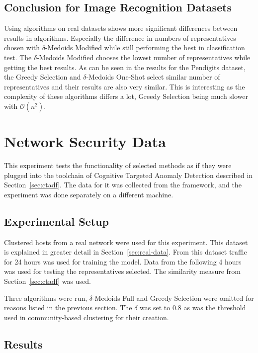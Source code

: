 \documentclass[thesis=B,english]{FITthesis}[2012/10/20]
\begin{document}
\subsection{Conclusion for Image Recognition Datasets}
Using algorithms on real datasets shows more significant differences between results in algorithms.
Especially the difference in numbers of representatives chosen with $\delta$-Medoids Modified while still performing the best in classification test.
The $\delta$-Medoids Modified chooses the lowest number of representatives while getting the best results.
As can be seen in the results for the Pendigits dataset, the Greedy Selection and $\delta$-Medoids One-Shot select similar number of representatives and their results are also very similar.
This is interesting as the complexity of these algorithms differs a lot, Greedy Selection being much slower with $\mathcal{O}(n^2)$.

\section{Network Security Data}\label{sec:exp4}

This experiment tests the functionality of selected methods as if they were plugged into the toolchain of Cognitive Targeted Anomaly Detection described in Section~\ref{sec:ctadf}.
The data for it was collected from the framework, and the experiment was done separately on a different machine.

\subsection{Experimental Setup}
Clustered hosts from a real network were used for this experiment.
This dataset is explained in greater detail in Section~\ref{sec:real-data}.
From this dataset traffic for 24 hours was used for training the model.
Data from the following 4 hours was used for testing the representatives selected.
The similarity measure from Section~\ref{sec:ctadf} was used.

Three algorithms were run, $\delta$-Medoids Full and Greedy Selection were omitted for reasons listed in the previous section.
The $\delta$ was set to 0.8 as was the threshold used in community-based clustering for their creation.

\subsection{Results}
\end{document}
